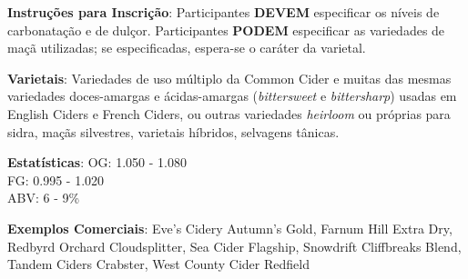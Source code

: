 \textbf{Instruções para Inscrição}: Participantes \textbf{DEVEM} especificar os níveis de carbonatação e de dulçor. Participantes \textbf{PODEM} especificar as variedades de maçã utilizadas; se especificadas, espera-se o caráter da varietal.

\textbf{Varietais}: Variedades de uso múltiplo da Common Cider e muitas das mesmas variedades doces-amargas e ácidas-amargas (\textit{bittersweet} e \textit{bittersharp}) usadas em English Ciders e French Ciders, ou outras variedades \textit{heirloom} ou próprias para sidra, maçãs silvestres, varietais híbridos, selvagens tânicas.

\textbf{Estatísticas}: OG: 1.050 - 1.080 \\
\phantom{ } \hspace{16.5mm} FG: 0.995 - 1.020 \\
\phantom{ } \hspace{16.5mm} ABV: 6 - 9\%

\textbf{Exemplos Comerciais}: Eve's Cidery Autumn's Gold, Farnum Hill Extra Dry, Redbyrd Orchard Cloudsplitter, Sea Cider Flagship, Snowdrift Cliffbreaks Blend, Tandem Ciders Crabster, West County Cider Redfield
